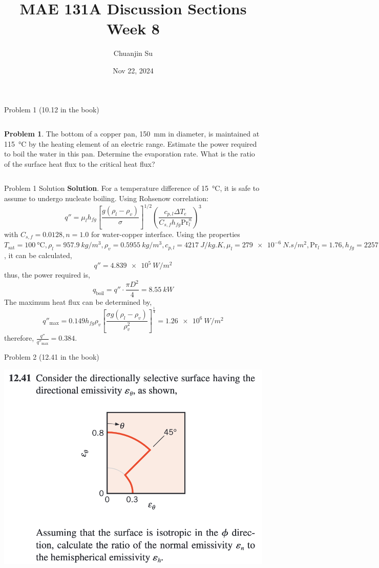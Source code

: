 \documentclass[9pt, aspectratio=169, handout]{beamer}
\title{MAE 131A Discussion Sections\\ Week 8}
\author{Chuanjin Su}
\institute[UCLA MAE]{Mechanical and Aerospace Engineering Department\\
    University of California, Los Angeles}
\date{Nov 22, 2024}
\begin{document}
\begin{frame}
    \titlepage
\end{frame}

\begin{frame}{Problem 1 (10.12 in the book)}
    \begin{columns}
        \textbf{Problem 1}. The bottom of a copper pan, \SI{150}{mm} in diameter, is maintained at \SI{115}{\celsius} by the heating element of an electric range. Estimate the power required to boil the water in this pan. Determine the evaporation rate. What is the ratio of the surface heat flux to the critical heat flux?
    \end{columns}
\end{frame}

\begin{frame}{Problem 1 Solution}
    \textbf{Solution}. For a temperature difference of \SI{15}{\celsius}, it is safe to assume to undergo nucleate boiling. Using Rohsenow correlation:
    $$
    q'' = \mu_l h_{fg} \left[\frac{g(\rho_l - \rho_v)}{\sigma}\right]^{1/2} \left(\frac{c_{p,l}\Delta T_e}{C_{s,f}h_{fg}\mathrm{Pr}_l^n}\right)^3
    $$
    with $C_{s,f} = 0.0128, n = 1.0$ for water-copper interface. Using the properties $T_{\text{sat}} = \SI{100}{\celsius}, \rho_l = \SI{957.9}{kg/m^3}, \rho_v = \SI{0.5955}{kg/m^3}, c_{p,l} = \SI{4217}{J/kg.K}, \mu_l = \SI{279e-6}{N.s/m^2}, \mathrm{Pr}_l = 1.76, h_{fg} = \SI{2257}{kJ/kg}, \sigma = \SI{58.9e-3}{N/m}$, it can be calculated,
    $$
    q'' = \SI{4.839e5}{W/m^2}
    $$
    thus, the power required is,
    $$
    q_{\text{boil}} = q'' \cdot \frac{\pi D^2}{4} = \SI{8.55}{kW}
    $$
    The maximum heat flux can be determined by,
    $$
    q''_{\text{max}} = 0.149 h_{fg}\rho_v \left[\frac{\sigma g (\rho_l - \rho_v)}{\rho_v^2}\right]^{\frac{1}{4}} = \SI{1.26e6}{W/m^2}
    $$
    therefore, $\frac{q''}{q''_{\text{max}}} = 0.384$.
    \hfill\qedsymbol
\end{frame}

\begin{frame}{Problem 2 (12.41 in the book)}
    \begin{center}
        \includegraphics[width=.5\textwidth]{Figures/problem_12.41.png}
    \end{center}
\end{frame}
\end{document}
